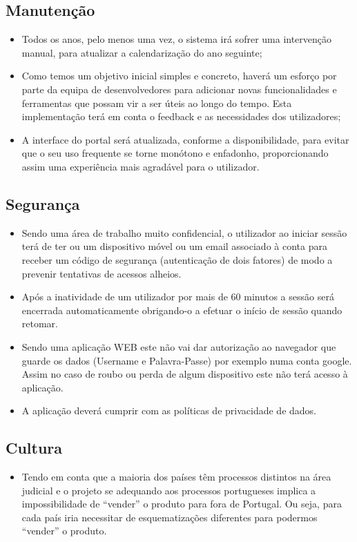 \subsection{Manutenção}
\begin{itemize}
    \item	Todos os anos, pelo menos uma vez, o sistema irá sofrer uma intervenção manual, para atualizar a calendarização do ano seguinte;

    \item	Como temos um objetivo inicial simples e concreto, haverá um esforço por parte da equipa de desenvolvedores para adicionar novas funcionalidades e ferramentas que possam vir a ser úteis ao longo do tempo. Esta implementação terá em conta o feedback e as necessidades dos utilizadores;

    \item	A interface do portal será atualizada, conforme a disponibilidade, para evitar que o seu uso frequente se torne monótono e enfadonho, proporcionando assim uma experiência mais agradável para o utilizador.
\end{itemize}
\newpage
\subsection{Segurança}
\begin{itemize}
    \item Sendo uma área de trabalho muito confidencial, o utilizador ao iniciar sessão terá de ter ou um dispositivo móvel ou um email associado à conta para receber um código de segurança (autenticação de dois fatores) de modo a prevenir tentativas de acessos alheios. 
    \item Após a inatividade de um utilizador por mais de 60 minutos a sessão será encerrada automaticamente obrigando-o a efetuar o início de sessão quando retomar.
    \item Sendo uma aplicação WEB este não vai dar autorização ao navegador que guarde os dados (Username e Palavra-Passe) por exemplo numa conta google. Assim no caso de roubo ou perda de algum dispositivo este não terá acesso à aplicação. 
    \item A aplicação deverá cumprir com as políticas de privacidade de dados.
\end{itemize}

\subsection{Cultura}
\begin{itemize}
    \item Tendo em conta que a maioria dos países têm processos distintos na área judicial e o projeto se adequando aos processos portugueses implica a impossibilidade de “vender” o produto para fora de Portugal. Ou seja, para cada país iria necessitar de esquematizações diferentes para podermos “vender” o produto.
\end{itemize}


